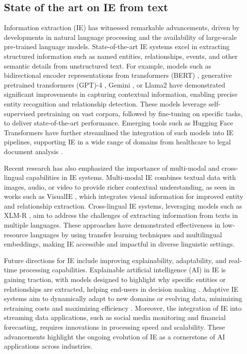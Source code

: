 \documentclass{article}
\begin{document}
\subsection{State of the art on IE from text}
\par 
Information extraction (IE) has witnessed remarkable advancements, driven by developments in natural language processing and the availability of large-scale pre-trained language models. 
State-of-the-art IE systems excel in extracting structured information such as named entities, relationships, events, and other semantic details from unstructured text. 
For example, models such as bidirectional encoder representations from transformers (BERT) \citep{2019.JA.BPO}, generative pretrained transformers (GPT)-4 \citep{2024.OP.GTR}, Gemini \citep{2024.GE.G1U}, or Llama2 \citep{2023.HU.LOA} have demonstrated significant improvements in capturing contextual information, enabling precise entity recognition and relationship detection. 
These models leverage self-supervised pretraining on vast corpora, followed by fine-tuning on specific tasks, to deliver state-of-the-art performance. 
Emerging tools such as Hugging Face Transformers have further streamlined the integration of such models into IE pipelines, supporting IE in a wide range of domains from healthcare \citep{2023.JA.EIE} to legal document analysis \citep{2024.GU.CLA}.
\par
Recent research has also emphasized the importance of multi-modal and cross-lingual capabilities in IE systems. 
Multi-modal IE combines textual data with images, audio, or video to provide richer contextual understanding, as seen in works such as VisualIE \citep{2023.HA.VRI}, which integrates visual information for improved entity and relationship extraction. 
Cross-lingual IE systems, leveraging models such as XLM-R \citep{2019.AC.UCR}, aim to address the challenges of extracting information from texts in multiple languages. These approaches have demonstrated effectiveness in low-resource languages by using transfer learning techniques and multilingual embeddings, making IE accessible and impactful in diverse linguistic settings.
\par
Future directions for IE include improving explainability, adaptability, and real-time processing capabilities. 
Explainable artificial intelligence (AI) in IE is gaining traction, with models designed to highlight why specific entities or relationships are extracted, helping end-users in decision making \citep{2023.SU.GSC}. 
Adaptive IE systems aim to dynamically adapt to new domains or evolving data, minimizing retraining costs and maximizing efficiency \citep{2023.AM.ATP}. 
Moreover, the integration of IE into streaming data applications, such as social media monitoring and financial forecasting, requires innovations in processing speed and scalability. 
These advancements highlight the ongoing evolution of IE as a cornerstone of AI applications across industries.
\end{document}
